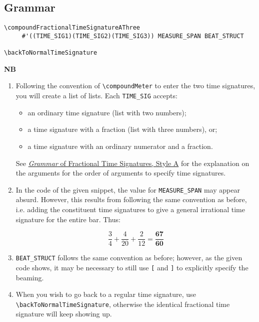 \subsection{Grammar}
\label{sec:compoundfractionalmeter_grammar}
\begin{verbatim}
\compoundFractionalTimeSignatureAThree 
     #'((TIME_SIG1)(TIME_SIG2)(TIME_SIG3)) MEASURE_SPAN BEAT_STRUCT

\backToNormalTimeSignature

\end{verbatim}
\textbf{NB} 
\begin{enumerate}
\item Following the convention of \verb|\compoundMeter| to enter the two time signatures, you will create a list of lists. Each \verb|TIME_SIG| accepts: 
\begin{itemize}
\item an ordinary time signature (list with two numbers);
\item a time signature with a fraction (list with three numbers), or; 
\item a time signature with an ordinary numerator and a fraction.
\end{itemize} 
See \hyperref[sec:time_signatures_styleA_convention]{\textit{Grammar} of Fractional Time Signatures, Style A} for the explanation on the arguments for the order of arguments to specify time signatures.
\item In the code of the given snippet, the value for \verb|MEASURE_SPAN| may appear absurd. However, this results from following the same convention as before, i.e. adding the constituent time signatures to give a general irrational time signature for the entire bar. Thus: \par
\[ \frac{3}{4} +\frac{4}{20} + \frac{2}{12} = \mathbf{\frac{67}{60}}\] \par
\item \verb|BEAT_STRUCT| follows the same convention as before; however, as the given code shows, it may be necessary to still use \verb|[| and \verb|]| to explicitly specify the beaming. 
\item When you wish to go back to a regular time signature, use \verb|\backToNormalTimeSignature|, otherwise the identical fractional time signature will keep showing up.

\end{enumerate}
